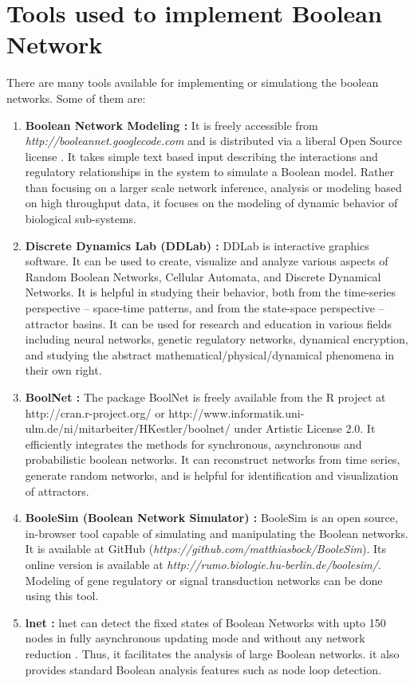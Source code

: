 \documentclass[11pt]{report}
\begin{document}
    \section{Tools used to implement Boolean Network}
    There are many tools available for implementing or simulationg the boolean networks.
    Some of them are:
    \begin{enumerate}
     \item \textbf{Boolean Network Modeling : } It is freely accessible from \emph{http://booleannet.googlecode.com} and is distributed via a liberal Open Source license \cite{Albert2008}.
     It takes simple text based input describing the interactions and regulatory relationships in the system to simulate a Boolean model.
     Rather than focusing on a larger scale network inference, analysis or modeling based on high throughput data, it focuses on the modeling of dynamic behavior of biological sub-systems.
    \item \textbf{Discrete Dynamics Lab (DDLab) : } DDLab is interactive graphics software.\cite{Wuensche2008}
    It can be used to create, visualize and analyze various aspects of Random Boolean Networks, Cellular Automata, and Discrete Dynamical Networks.
    It is helpful in studying their behavior, both from the time-series perspective – space-time patterns, and from the state-space perspective – attractor basins.
    It can be used for research and education in various fields including neural networks, genetic regulatory networks, dynamical encryption, and studying the abstract mathematical/physical/dynamical phenomena in their own right.
    \item \textbf{BoolNet : } The package BoolNet is freely available from the R project at http://cran.r-project.org/ or http://www.informatik.uni- ulm.de/ni/mitarbeiter/HKestler/boolnet/ under Artistic License 2.0. \cite{Mussel2010}
    It efficiently integrates the methods for synchronous, asynchronous and probabilistic boolean networks.
    It can reconstruct networks from time series, generate random networks, and is helpful for identification and visualization of attractors.
    \item \textbf{BooleSim (Boolean Network Simulator) : } BooleSim is an open source, in-browser tool capable of simulating and manipulating the Boolean networks\cite{Bock2013}.
    It is available at GitHub (\emph{https://github.com/matthiasbock/BooleSim}).
    Its online version is available at \emph{http://rumo.biologie.hu-berlin.de/boolesim/}.
    Modeling of gene regulatory or signal transduction networks can be done using this tool.
    \item \textbf{lnet : } lnet can detect the fixed states of Boolean Networks with upto 150 nodes in fully asynchronous updating mode and without any network reduction \cite{Berntenis2013}.
    Thus, it facilitates the analysis of large Boolean networks.
    it also provides standard Boolean analysis features such as node loop detection.
    
    \end{enumerate}
    
\end{document}
